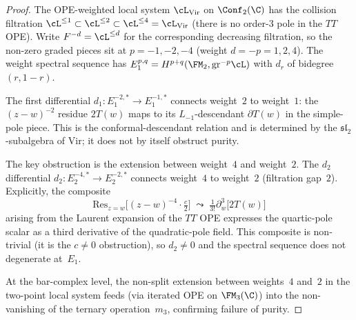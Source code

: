 \begin{proof}
The OPE-weighted local system $\cL_{\mathrm{Vir}}$ on
$\Conf_2(\C)$ has the collision filtration
$\cL^{\leq 1} \subset \cL^{\leq 2} \subset \cL^{\leq 4} =
\cL_{\mathrm{Vir}}$ (there is no order-$3$ pole in the $TT$ OPE).
Write $F^{-d} = \cL^{\leq d}$ for the corresponding decreasing
filtration, so the non-zero graded pieces sit at
$p = -1, -2, -4$ (weight $d = -p = 1, 2, 4$).
The weight spectral sequence has
$E_1^{p,q} = H^{p+q}(\FM_2, \mathrm{gr}^{-p}\cL)$
with $d_r$ of bidegree $(r, 1-r)$.

The first differential $d_1\colon E_1^{-2,*} \to E_1^{-1,*}$
connects weight~$2$ to weight~$1$: the $(z-w)^{-2}$ residue
$2T(w)$ maps to its $L_{-1}$-descendant $\partial T(w)$ in the
simple-pole piece. This is the conformal-descendant relation
and is determined by the $\mathfrak{sl}_2$-subalgebra of
$\mathrm{Vir}$; it does not by itself obstruct purity.

The key obstruction is the extension between weight~$4$ and
weight~$2$. The $d_2$ differential
$d_2\colon E_2^{-4,*} \to E_2^{-2,*}$
connects weight~$4$ to weight~$2$ (filtration gap~$2$).
Explicitly, the composite
\[
\mathrm{Res}_{z=w}\bigl[(z-w)^{-4} \cdot \tfrac{c}{2}\bigr]
\;\leadsto\; \tfrac{1}{3!}\partial^3_w\bigl[2T(w)\bigr]
\]
arising from the Laurent expansion of the $TT$ OPE expresses
the quartic-pole scalar as a third derivative of the
quadratic-pole field. This composite is non-trivial
(it is the $c \neq 0$ obstruction), so $d_2 \neq 0$ and
the spectral sequence does not degenerate at~$E_1$.

At the bar-complex level, the non-split extension between
weights~$4$ and~$2$ in the two-point local system feeds
(via iterated OPE on $\FM_3(\C)$) into the non-vanishing
of the ternary operation~$m_3$, confirming failure of purity.
\end{proof}

